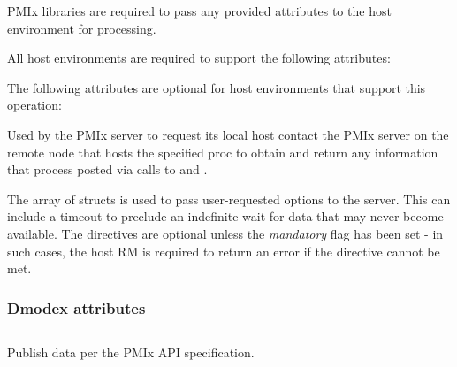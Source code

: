 \reqattrstart
\ac{PMIx} libraries are required to pass any provided attributes to the host environment for processing.

All host environments are required to support the following attributes:


\reqattrend

\optattrstart
The following attributes are optional for host environments that support this operation:


\optattrend

\descr

Used by the \ac{PMIx} server to request its local host contact the \ac{PMIx} server on the remote node that hosts the specified proc to obtain and return any information that process posted via calls to  and .

The array of  structs is used to pass user-requested options to the server.
This can include a timeout to preclude an indefinite wait for data that may never become available.
The directives are optional unless the \emph{mandatory} flag has been set - in such cases, the host \ac{RM} is required to return an error if the directive cannot be met.

\subsubsection{Dmodex attributes}

%


\subsection{}

\summary

Publish data per the PMIx API specification.

\format


